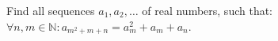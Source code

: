 \begin{problem}
    Find all sequences \( a_1, a_2, \dots \) of real numbers, such that:\\
    \indent \( \forall n,m \in \mathbb{N} : a_{m^2+m+n} = a^2_m+a_m+a_n \).
\end{problem}
